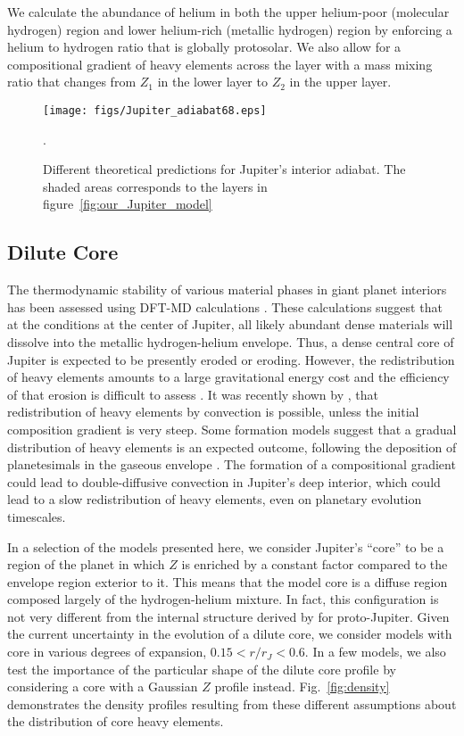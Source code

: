 We calculate the abundance of helium in both the upper helium-poor
(molecular hydrogen) region and lower helium-rich (metallic hydrogen) region by
enforcing a helium to hydrogen ratio that is globally protosolar. We also allow
for a compositional gradient of heavy elements across the layer with a mass
mixing ratio that changes from $Z_1$ in the lower layer to $Z_2$ in the upper
layer. 

\begin{figure}[h]
  \begin{center}
    \noindent\texttt{[image: figs/Jupiter\_adiabat68.eps]}
  \end{center}
  \caption{Different theoretical predictions for Jupiter's interior adiabat. The shaded areas corresponds to the layers
    in figure~\ref{fig:our_Jupiter_model}}. 
  \label{fig:jup}
\end{figure}

\subsection{Dilute Core} \label{sec:dilute}

The thermodynamic stability of various material phases in giant planet
interiors has been assessed using DFT-MD calculations
\citep{wilson2012a,Wilson2012b,Wahl2013,Gonzalez2013}.  These calculations
suggest that at the conditions at the center of Jupiter, all likely abundant
dense materials will dissolve into the metallic hydrogen-helium envelope. Thus,
a dense central core of Jupiter is expected to be presently eroded or eroding.
However, the redistribution of heavy elements amounts to a large gravitational
energy cost and the efficiency of that erosion is difficult to assess
\citep[see][]{Guillot2004}.  It was recently shown by \citet{vazan2016},  that
redistribution of heavy elements by convection is possible, unless the initial
composition gradient is very steep.  Some formation models suggest that a
gradual distribution of heavy elements is an expected outcome, following the
deposition of planetesimals in the gaseous envelope \citep{lozovsky2017}. The
formation of a compositional gradient could lead to double-diffusive convection
\citep{Chabrier2007,Leconte2013} in Jupiter's deep interior, which could lead
to a slow redistribution of heavy elements, even on planetary evolution
timescales.

In a selection of the models presented here, we consider Jupiter's ``core'' to
be a region of the planet in which $Z$ is enriched by a constant factor
compared to the envelope region exterior to it. This means that the model core
is a diffuse region composed largely of the hydrogen-helium mixture. In fact,
this configuration is not very different from the internal structure derived by
\citet{lozovsky2017} for proto-Jupiter.  Given the current uncertainty in the
evolution of a dilute core, we consider models with core in various degrees of
expansion, $0.15<r/r_J<0.6$.  In a few models, we also test the importance of
the particular shape of the dilute core profile by considering a core with a
Gaussian $Z$ profile instead.  Fig.~\ref{fig:density} demonstrates the density
profiles resulting from these different assumptions about the distribution of
core heavy elements. 

